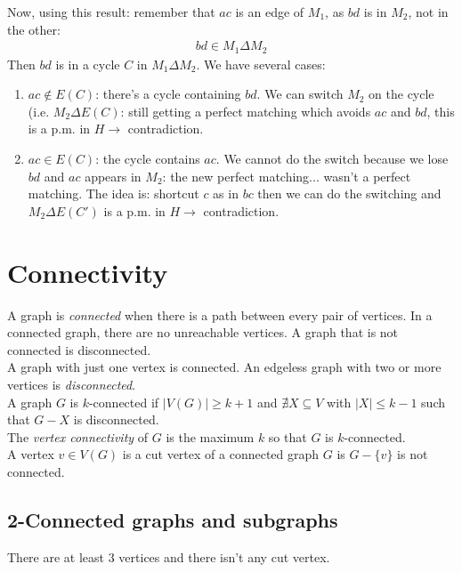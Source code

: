 \documentclass[11pt]{book}
\begin{document}
			Now, using this result: remember that $ac$ is an edge of $M_1$, as $bd$ is in $M_2$, not in the other:
			\begin{eqnarray}
				bd \in M_1 \Delta M_2
			\end{eqnarray}
			Then $bd$ is in a cycle $C$ in $M_1 \Delta M_2$.
			We have several cases:
			\begin{enumerate}
				\item $ac \notin E(C)$: there's a cycle containing $bd$. We can switch $M_2$ on the cycle (i.e. $M_2 \Delta E(C)$: still getting a perfect matching which avoids $ac$ and $bd$, this is a p.m. in $H \longrightarrow $ contradiction.
				\item $ac \in E(C)$: the cycle contains $ac$. We cannot do the switch because we lose $bd$ and $ac$ appears in $M_2$: the new perfect matching... wasn't a perfect matching. The idea is: shortcut $c$ as in $bc$ then we can do the switching and $M_2 \Delta E(C')$ is a p.m. in $H \longrightarrow$ contradiction.
			\end{enumerate}
			
\chapter{Connectivity}
	A graph is \textit{connected} when there is a path between every pair of vertices. In a connected graph, there are no unreachable vertices. A graph that is not connected is disconnected. \\
	
	A graph with just one vertex is connected. An edgeless graph with two or more vertices is \textit{disconnected}.\\
	
	A graph $G$ is $k$-connected if $|V(G)| \geq k + 1$ and $\nexists X \subseteq V$ with $|X| \leq k-1$ such that $G-X$ is disconnected.\\	
	
	The \textit{vertex connectivity} of $G$ is the maximum $k$ so that $G$ is $k$-connected.\\
	
	A vertex $v \in V(G)$ is a cut vertex of a connected graph $G$ is $G - \{ v \}$  is not connected.

	\section{2-Connected graphs and subgraphs}
		There are at least 3 vertices and there isn't any cut vertex.\\
		
\end{document}
